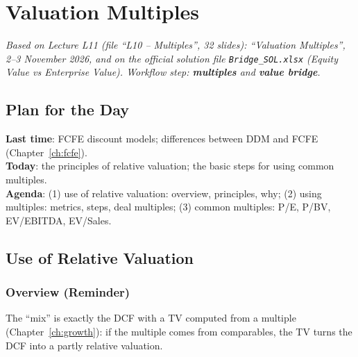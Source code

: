 \chapter{Valuation Multiples}\label{ch:multiples}

\emph{Based on Lecture L11 (file ``L10 -- Multiples'', 32 slides): ``Valuation Multiples'', 2--3 November 2026, and on the official solution file \texttt{Bridge\_SOL.xlsx} (Equity Value vs Enterprise Value). Workflow step: \textbf{multiples} and \textbf{value bridge}.}

\section{Plan for the Day}
\textbf{Last time}: FCFE discount models; differences between DDM and FCFE (Chapter~\ref{ch:fcfe}).\\
\textbf{Today}: the principles of relative valuation; the basic steps for using common multiples.\\
\textbf{Agenda}: (1) use of relative valuation: overview, principles, why; (2) using multiples: metrics, steps, deal multiples; (3) common multiples: P/E, P/BV, EV/EBITDA, EV/Sales.

\section{Use of Relative Valuation}

\subsection{Overview (Reminder)}
\begin{center}
\end{center}
\begin{addbox}
The ``mix'' is exactly the DCF with a TV computed from a multiple (Chapter~\ref{ch:growth}): if the multiple comes from comparables, the TV turns the DCF into a partly relative valuation.
\end{addbox}

